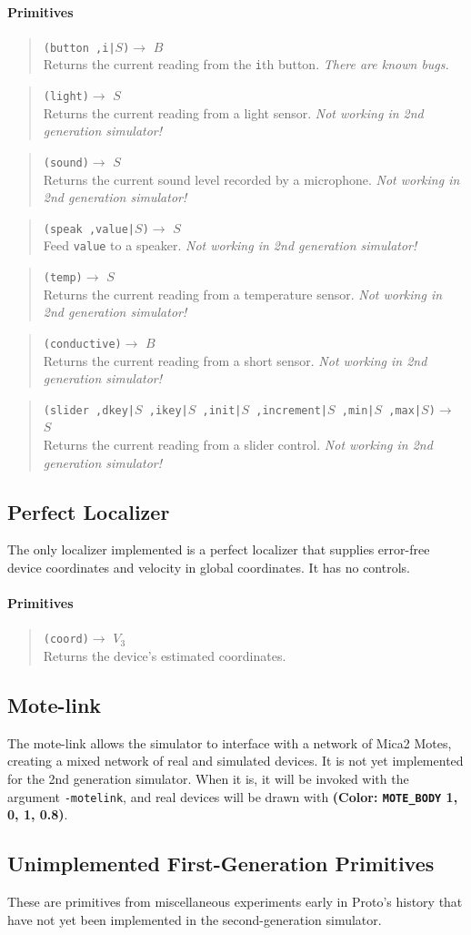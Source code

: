 \documentclass{article}
\newcommand\nosecgen{{\em Not working in 2nd generation simulator!}}
\newcommand\bugs{{\em There are known bugs.}}
\newcommand\var[1]{{\tt #1}}
\newcommand\color[5]{{\bf (Color: {\tt #1} #2, #3, #4, #5)}} %
\newcommand\function[3]
{\begin{quote}{\tt #1}$\rightarrow$ \type{#2} \\ #3 \end{quote}}
\newcommand\type[1]{$#1$}
\begin{document}
\paragraph{Primitives}

\function{(button ,i|\type{S})}{B}{Returns the current reading from 
  the \var{i}th button.  \bugs{}}

\function{(light)}{S}{Returns the current reading from a light sensor.
  \nosecgen{}}
\function{(sound)}{S}{Returns the current sound level recorded by a
  microphone. \nosecgen{}}
\function{(speak ,value|\type{S})}{S}{Feed \var{value} to a speaker.
  \nosecgen{}}
\function{(temp)}{S}{Returns the current reading from a temperature
  sensor.  \nosecgen{}}
\function{(conductive)}{B}{Returns the current reading from a short
  sensor.  \nosecgen{}}

\function{(slider ,dkey|\type{S} ,ikey|\type{S} ,init|\type{S}
  ,increment|\type{S} ,min|\type{S} ,max|\type{S})}{S}{Returns the
  current reading from a slider control.  \nosecgen{}}


\subsection{Perfect Localizer} 
The only localizer implemented is a perfect localizer that supplies
error-free device coordinates and velocity in global coordinates.  It
has no controls.

\paragraph{Primitives}

\function{(coord)}{V_3}{Returns the device's estimated coordinates.}

\subsection{Mote-link}

The mote-link allows the simulator to interface with a network of
Mica2 Motes, creating a mixed network of real and simulated devices.
It is not yet implemented for the 2nd generation simulator.  When it
is, it will be invoked with the argument \var{-motelink}, and real
devices will be drawn with \color{MOTE\_BODY}{1}{0}{1}{0.8}.

\subsection{Unimplemented First-Generation Primitives}
These are primitives from miscellaneous experiments early in Proto's
history that have not yet been implemented in the second-generation
simulator.
\end{document}
